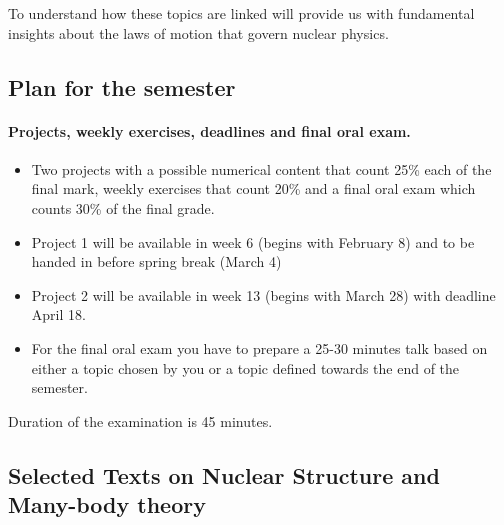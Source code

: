 \documentclass[%
oneside,                 %
final,                   %
10pt]{article}
\begin{document}
\noindent
To understand how these topics are linked will provide us with fundamental insights about the laws of motion that govern nuclear physics.




\subsection*{Plan for the semester}

\paragraph{Projects, weekly exercises, deadlines and final oral exam.}
\begin{itemize}
\item Two  projects with a possible numerical content that count 25\% each of the final mark, weekly exercises  that count 20\% and a final oral exam which counts 30\% of the final grade. 

\item Project 1 will be available in week 6 (begins with February 8) and to be handed in before spring break (March 4)

\item Project 2 will be available in week 13 (begins with March 28) with deadline April 18.

\item For the final oral exam you have to prepare a 25-30 minutes talk based on either a topic chosen by you or a topic defined towards the end of the semester.
\end{itemize}

\noindent
Duration of the examination is 45 minutes.




\subsection*{Selected Texts on Nuclear Structure and Many-body theory}

\end{document}
